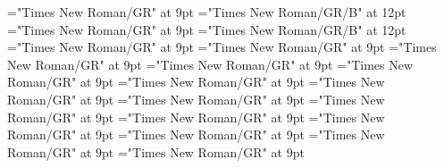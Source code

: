 \documentclass[gps1,twoside]{article}
\begin{document}
\font\configtargetconfigtargetconfigtargetslexsensereferencelexsensereferencessensesensessensesensessubentrysubentriesentrybefore="Times New Roman/GR" at 9pt
\font\spanbzhheadwordconfigtargetconfigtargetslexsensereferencelexsensereferencessensesensessensesensessubentrysubentriesentry="Times New Roman/GR/B" at 12pt
\font\spanspanheadwordconfigtargetconfigtargetslexsensereferencelexsensereferencessensesensessensesensessubentrysubentriesentrybefore="Times New Roman/GR" at 9pt
\font\spanheadwordconfigtargetconfigtargetslexsensereferencelexsensereferencessensesensessensesensessubentrysubentriesentry="Times New Roman/GR/B" at 12pt
\font\variantformentrybackrefvariantformentrybackrefvariantformentrybackrefssensesensessensesensessubentrysubentriesentrybefore="Times New Roman/GR" at 9pt
\font\variantformentrybackrefssensesensessensesensessubentrysubentriesentrybefore="Times New Roman/GR" at 9pt
\font\variantformentrybackrefssensesensessensesensessubentrysubentriesentryafter="Times New Roman/GR" at 9pt
\font\variantentrytypevariantentrytypevariantentrytypesvariantformentrybackrefvariantformentrybackrefssensesensessensesensessubentrysubentriesentrybefore="Times New Roman/GR" at 9pt
\font\variantentrytypesvariantformentrybackrefvariantformentrybackrefssensesensessensesensessubentrysubentriesentryafter="Times New Roman/GR" at 9pt
\font\spanspanreverseabbrvariantentrytypevariantentrytypesvariantformentrybackrefvariantformentrybackrefssensesensessensesensessubentrysubentriesentrybefore="Times New Roman/GR" at 9pt
\font\spanreverseabbrvariantentrytypevariantentrytypesvariantformentrybackrefvariantformentrybackrefssensesensessensesensessubentrysubentriesentrylastchildafter="Times New Roman/GR" at 9pt
\font\spanspanheadwordvariantformentrybackrefvariantformentrybackrefssensesensessensesensessubentrysubentriesentrybefore="Times New Roman/GR" at 9pt
\font\spanspanowningentrysummarydefinitionvariantformentrybackrefvariantformentrybackrefssensesensessensesensessubentrysubentriesentrybefore="Times New Roman/GR" at 9pt
\font\spanowningentrysummarydefinitionvariantformentrybackrefvariantformentrybackrefssensesensessensesensessubentrysubentriesentrylastchildafter="Times New Roman/GR" at 9pt
\font\scientificnamesensesensessensesensessubentrysubentriesentryafter="Times New Roman/GR" at 9pt
\font\semanticdomainsemanticdomainsemanticdomainssensesensessensesensessubentrysubentriesentrybefore="Times New Roman/GR" at 9pt
\font\semanticdomainssensesensessensesensessubentrysubentriesentrybefore="Times New Roman/GR" at 9pt
\font\semanticdomainssensesensessensesensessubentrysubentriesentryafter="Times New Roman/GR" at 9pt
\end{document}
